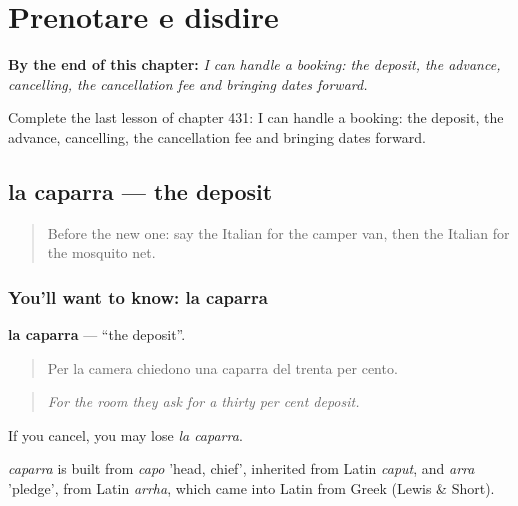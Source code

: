 
\chapter{Prenotare e disdire}
\label{ch:it-prenotare-e-disdire}

\begin{chapteropening}
\textbf{By the end of this chapter:} \emph{I can handle a booking: the deposit, the advance, cancelling, the cancellation fee and bringing dates forward.}

Complete the last lesson of chapter 431: I can handle a booking: the deposit, the advance, cancelling, the cancellation fee and bringing dates forward.
\end{chapteropening}

\section[la caparra]{la caparra — the deposit}

\label{lesson:IT-C431-caparra}



\begin{quote}
Before the new one: say the Italian for the camper van, then the Italian for the mosquito net.
\end{quote}

\subsection*{You'll want to know: la caparra}
\textbf{la caparra} — \textquotedblleft{}the deposit\textquotedblright{}.

\begin{quote}
Per la camera chiedono una caparra del trenta per cento.
\end{quote}

\begin{quote}
\emph{For the room they ask for a thirty per cent deposit.}
\end{quote}

If you cancel, you may lose \emph{la caparra}.

\begin{cousinweb}
\emph{caparra} is built from \emph{capo} 'head, chief', inherited from Latin \emph{caput}, and \emph{arra} 'pledge', from Latin \emph{arrha}, which came into Latin from Greek (Lewis \& Short).
\end{cousinweb}

